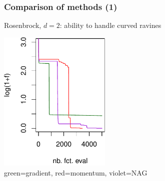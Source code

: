 \documentclass[12pt]{beamer}
\begin{document}
\begin{frame}
\frametitle{Comparison of methods (1)} 
Rosenbrock, $d=2$: ability to handle curved ravines
\begin{center}
\includegraphics[width=0.4\textwidth]{rosen_comparison-crop.pdf} \\
green=gradient, red=momentum, violet=NAG
\end{center}
\end{frame}
\end{document}
